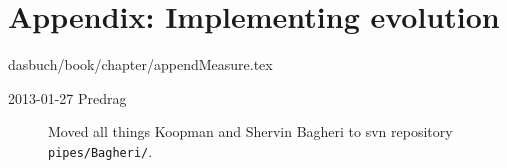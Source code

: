 \section{Appendix: Implementing evolution}
\label{c-appendMeasure}\noindent dasbuch/book/chapter/appendMeasure.tex
\begin{description}
\item[2013-01-27 Predrag] Moved all things Koopman and Shervin Bagheri
to svn repository \texttt{pipes/Bagheri/}.
\end{description}

%
%
%
%
%
%
%
%
%
